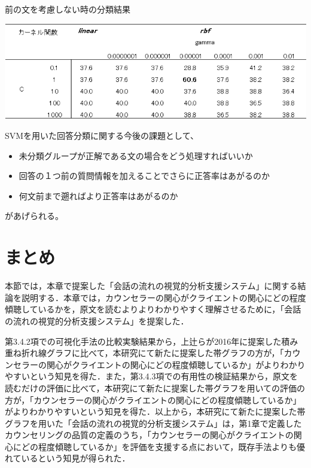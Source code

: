 \documentclass[shuuron]{kuee}
\begin{document}
\begin{table}
  \caption{前の文を考慮しない時の分類結果}
  \label{table:hayashida4}
  \begin{center}
    \includegraphics[width=\linewidth]{hayashida4.png}
  \end{center}
\end{table}

SVMを用いた回答分類に関する今後の課題として、
\begin{itemize}
  \item 未分類グループが正解である文の場合をどう処理すればいいか
  \item 回答の１つ前の質問情報を加えることでさらに正答率はあがるのか
  \item   何文前まで遡ればより正答率はあがるのか
\end{itemize}
があげられる。


\section{まとめ}

本節では，本章で提案した「会話の流れの視覚的分析支援システム」に関する結論を説明する．本章では，カウンセラーの関心がクライエントの関心にどの程度傾聴しているかを，原文を読むよりよりわかりやすく理解させるために，「会話の流れの視覚的分析支援システム」を提案した．

第3.4.2項での可視化手法の比較実験結果から，上辻らが2016年に提案した積み重ね折れ線グラフに比べて，本研究にて新たに提案した帯グラフの方が，「カウンセラーの関心がクライエントの関心にどの程度傾聴しているか」がよりわかりやすいという知見を得た．また，第3.4.3項での有用性の検証結果から，原文を読むだけの評価に比べて，本研究にて新たに提案した帯グラフを用いての評価の方が，「カウンセラーの関心がクライエントの関心にどの程度傾聴しているか」がよりわかりやすいという知見を得た．以上から，本研究にて新たに提案した帯グラフを用いた「会話の流れの視覚的分析支援システム」は，第1章で定義したカウンセリングの品質の定義のうち，「カウンセラーの関心がクライエントの関心にどの程度傾聴しているか」を評価を支援する点において，既存手法よりも優れているという知見が得られた．
\end{document}

